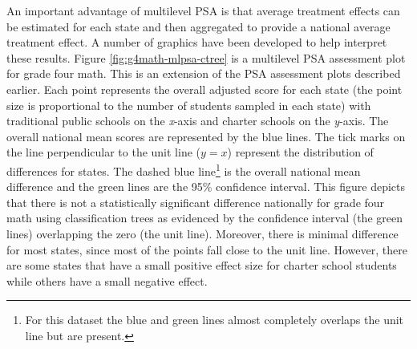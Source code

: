 \documentclass[letterpaper,12pt]{article} %
\begin{document}
An important advantage of multilevel PSA is that average treatment effects can be estimated for each state and then aggregated to provide a national average treatment effect. A number of graphics have been developed to help interpret these results. Figure \ref{fig:g4math-mlpsa-ctree} is a multilevel PSA assessment plot for grade four math. This is an extension of the PSA assessment plots \cite{HelmreichPruzek2009} described earlier. Each point represents the overall adjusted score for each state (the point size is proportional to the number of students sampled in each state) with traditional public schools on the \textit{x}-axis and charter schools on the \textit{y}-axis. The overall national mean scores are represented by the blue lines. The tick marks on the line perpendicular to the unit line ($y = x$) represent the distribution of differences for states. The dashed blue line\footnote{For this dataset the blue and green lines almost completely overlaps the unit line but are present.} is the overall national mean difference and the green lines are the 95\% confidence interval. This figure depicts that there is not a statistically significant difference nationally for grade four math using classification trees as evidenced by the confidence interval (the green lines) overlapping the zero (the unit line). Moreover, there is minimal difference for most states, since most of the points fall close to the unit line. However, there are some states that have a small positive effect size for charter school students  while others have a small negative effect. 
\end{document}
